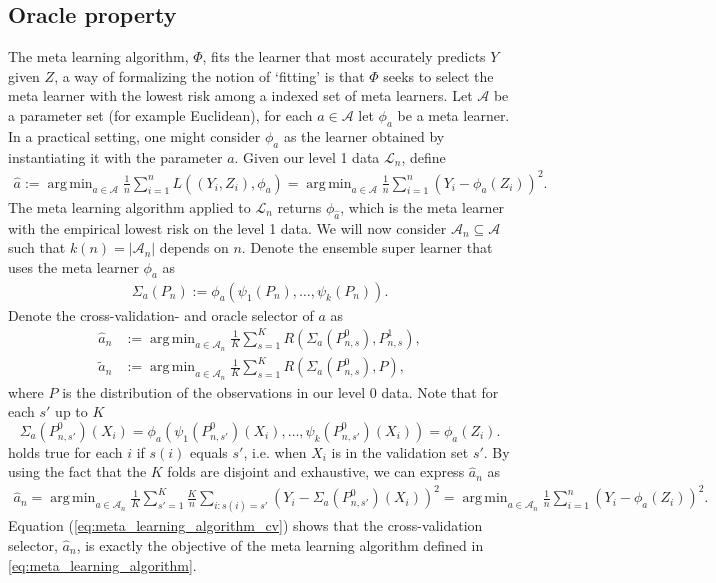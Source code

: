 \documentclass[11pt, a4paper]{article}
\DeclareMathOperator*{\argmin}{arg\,min}
\theoremstyle{definition}
\theoremstyle{remark}
\newcommand{\ml}{k}
\newcommand{\la}{\psi}
\newcommand{\lone}{\mathcal{L}}
\newcommand{\meta}{\phi}
\newcommand{\Meta}{\Phi}
\newcommand{\esl}{\Sigma}
\begin{document}
\subsection{Oracle property}
The meta learning algorithm, $ \Meta $, fits the learner that most accurately predicts $ Y $ given $ Z $, a way of formalizing the notion of `fitting' is that $ \Meta $ seeks to select the meta learner with the lowest risk among a indexed set of meta learners. Let $ \mathcal{A} $ be a parameter set (for example Euclidean), for each $ a \in \mathcal{A} $ let $ \meta_{a} $ be a meta learner. In a practical setting, one might consider $ \meta_{a} $ as the learner obtained by instantiating it with the parameter $ a $. Given our level 1 data $ \lone_{n} $, define 
\begin{align} \label{eq:meta_learning_algorithm}
    \hat{a} := \argmin_{a \in \mathcal{A}} \frac{1}{n} \sum_{i = 1}^{n} L((Y_i, Z_i), \meta_{a}) = \argmin_{a \in \mathcal{A}} \frac{1}{n} \sum_{i = 1}^{n} (Y_i - \meta_{a}(Z_i))^2.
\end{align}
The meta learning algorithm applied to $ \lone_{n} $ returns $ \meta_{ \hat{a} } $, which is the meta learner with the empirical lowest risk on the level 1 data. We will now consider $ \mathcal{A}_n \subseteq \mathcal{A} $ such that $ \ml(n) = |\mathcal{A}_{n}| $ depends on $ n $. Denote the ensemble super learner that uses the meta learner $ \meta_{ a } $ as 
\begin{align*}
    \esl_{a}(P_{n}) := \meta_{a}(\la_1(P_{n}), \ldots, \la_k(P_{n})).
\end{align*}
Denote the cross-validation- and oracle selector of $ a $ as 
\begin{align*}
    \hat{a}_n &:= \argmin_{a \in \mathcal{A}_{n}} \frac{1}{K} \sum_{s = 1}^{K} R(\esl_{a}(P_{n, s}^{0}), P_{n, s}^{1}), \\
    \tilde{a}_n &:= \argmin_{a \in \mathcal{A}_n} \frac{1}{K} \sum_{s = 1}^{K} R(\esl_{a}(P_{n, s}^{0}) , P),
\end{align*}
where $ P $ is the distribution of the observations in our level 0 data. Note that for each $ s' $ up to $ K $ 
$$ \esl_a(P_{n, s'}^{0})(X_i) = \meta_{a}(\la_{1}(P_{n, s'}^{0})(X_i) , \dots , \la_{\ml}(P_{n, s'}^{0})(X_i) ) = \meta_{a}(Z_i). $$ 
holds true for each $ i $ if $ s(i)$ equals $ s' $, i.e. when $ X_i $ is in the validation set $ s' $. By using the fact that the $ K $ folds are disjoint and exhaustive, we can express $ \hat{a}_n $ as  
\begin{align} \label{eq:meta_learning_algorithm_cv}
    \hat{a}_n = \argmin_{a \in \mathcal{A}_n} \frac{1}{K} \sum_{s' = 1}^{K} \frac{K}{n} \sum_{i: s(i) = s'} (Y_i - \esl_{a}(P_{n,s'}^{0}) (X_i))^2 = \argmin_{a \in \mathcal{A}_n} \frac{1}{n} \sum_{i = 1}^{n} (Y_i - \meta_{a}(Z_i))^2.
\end{align}
Equation (\ref{eq:meta_learning_algorithm_cv}) shows that the cross-validation selector, $ \hat{a}_n $, is exactly the objective of the meta learning algorithm defined in \eqref{eq:meta_learning_algorithm}. 
\end{document}

